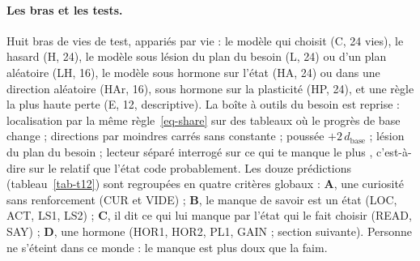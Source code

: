 \documentclass[11pt,a4paper]{article}
\begin{document}
\paragraph{Les bras et les tests.} Huit bras de vies de test, appariés par vie :
le modèle qui choisit (C, 24 vies), le hasard (H, 24), le modèle sous lésion du plan
du besoin (L, 24) ou d'un plan aléatoire (LH, 16), le modèle sous hormone sur l'état
(HA, 24) ou dans une direction aléatoire (HAr, 16), sous hormone sur la plasticité
(HP, 24), et une règle \og la plus haute perte \fg{} (E, 12, descriptive). La boîte à
outils du besoin est reprise : localisation par la même règle~\eqref{eq-share} sur
des tableaux où le progrès de \og base \fg{} change ; directions par moindres carrés
sans constante ; poussée $+2\,d_\text{base}$ ; lésion du plan du besoin ; lecteur
séparé interrogé sur \og ce qui te manque le plus \fg{}, c'est-à-dire sur le relatif
que l'état code probablement. Les douze prédictions (tableau~\ref{tab-t12}) sont
regroupées en quatre critères globaux : \textbf{A}, une curiosité sans renforcement
(CUR et VIDE) ; \textbf{B}, le manque de savoir est un état (LOC, ACT, LS1, LS2) ;
\textbf{C}, il dit ce qui lui manque par l'état qui le fait choisir (READ, SAY) ;
\textbf{D}, une hormone (HOR1, HOR2, PL1, GAIN ; section suivante). Personne ne
s'éteint dans ce monde : le manque est plus doux que la faim.
\end{document}
